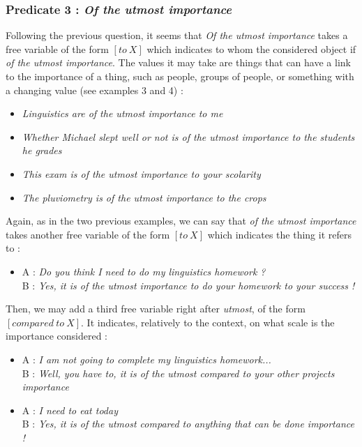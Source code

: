 \documentclass{cours}
\begin{document}
                \subsubsection{Predicate 3 : \textsl{Of the utmost importance}}
                    Following the previous question, it seems that \textsl{Of the utmost importance} takes a free variable of the form $\left[to \ X\right]$ which indicates to whom the considered object if \textsl{of the utmost importance}. The values it may take are things that can have a link to the importance of a thing, such as people, groups of people, or something with a changing value (see examples 3 and 4) :
                    \begin{itemize}
                        \item \textsl{Linguistics are of the utmost importance \textit{to me}}
                        \item \textsl{Whether Michael slept well or not is of the utmost importance \textit{to the students he grades}}
                        \item \textsl{This exam is of the utmost importance \textit{to your scolarity}}
                        \item \textsl{The pluviometry is of the utmost importance \textit{to the crops}}
                    \end{itemize}
    
                    Again, as in the two previous examples, we can say that \textsl{of the utmost importance} takes another free variable of the form $\left[to \ X\right]$ which indicates the thing it refers to : 
                    \begin{itemize}
                        \item A : \textsl{Do you think I need to do my linguistics homework ?}\\
                        B : \textsl{Yes, it is of the utmost importance \textit{to do your homework} \textit{to your success} !}
                    \end{itemize}
    
                    Then, we may add a third free variable right after \textsl{utmost}, of the form $\left[compared\ to \ X\right]$. It indicates, relatively to the context, on what scale is the importance considered : 
                    \begin{itemize}
                        \item A : \textsl{I am not going to complete my linguistics homework...}\\
                        B : \textsl{Well, you have to, it is of the utmost \textit{compared to your other projects} importance}
                        \item A : \textsl{I need to eat today}\\
                        B : \textsl{Yes, it is of the utmost \textit{compared to anything that can be done} importance !}
                    \end{itemize}
    
\end{document}
